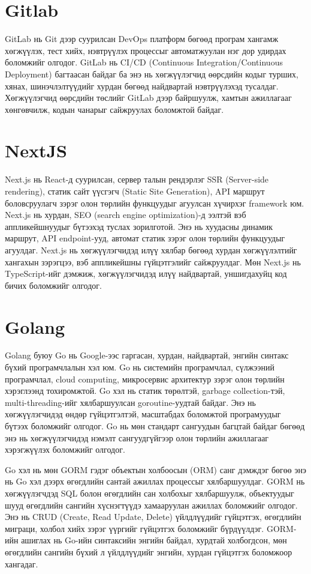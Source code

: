 \section{Gitlab}
GitLab нь Git дээр суурилсан DevOps платформ бөгөөд програм хангамж хөгжүүлэх, тест хийх, нэвтрүүлэх процессыг автоматжуулан нэг дор удирдах боломжийг олгодог. GitLab нь CI/CD (Continuous Integration/Continuous Deployment) багтаасан байдаг ба энэ нь хөгжүүлэгчид өөрсдийн кодыг турших, хянах, шинэчлэлтүүдийг хурдан бөгөөд найдвартай нэвтрүүлэхэд тусалдаг. Хөгжүүлэгчид өөрсдийн төслийг GitLab дээр байршуулж, хамтын ажиллагааг хөнгөвчилж, кодын чанарыг сайжруулах боломжтой байдаг.

\section{NextJS}
Next.js нь React-д суурилсан, сервер талын рендэрлэг SSR (Server-side rendering), статик сайт үүсгэгч (Static Site Generation), API маршрут боловсруулагч зэрэг олон төрлийн функцуудыг агуулсан хүчирхэг framework юм. Next.js нь хурдан, SEO (search engine optimization)-д ээлтэй вэб аппликейшнуудыг бүтээхэд туслах зорилготой. Энэ нь хуудасны динамик маршрут, API endpoint-ууд, автомат статик зэрэг олон төрлийн функцуудыг агуулдаг. Next.js нь хөгжүүлэгчидэд илүү хялбар бөгөөд хурдан хөгжүүлэлтийг хангахын зэрэгцээ, вэб аппликейшны гүйцэтгэлийг сайжруулдаг. Мөн Next.js нь TypeScript-ийг дэмжиж, хөгжүүлэгчидэд илүү найдвартай, уншигдахуйц код бичих боломжийг олгодог.

\section{Golang}
Golang буюу Go нь Google-ээс гаргасан, хурдан, найдвартай, энгийн синтакс бүхий програмчлалын хэл юм. Go нь системийн програмчлал, сүлжээний програмчлал, cloud computing, микросервис архитектур зэрэг олон төрлийн хэрэглээнд тохиромжтой. Go хэл нь статик төрөлтэй, garbage collection-тэй, multi-threading-ийг хялбаршуулсан goroutine-уудтай байдаг. Энэ нь хөгжүүлэгчидэд өндөр гүйцэтгэлтэй, масштабдах боломжтой програмуудыг бүтээх боломжийг олгодог. Go нь мөн стандарт сангуудын багцтай байдаг бөгөөд энэ нь хөгжүүлэгчидэд нэмэлт сангуудгүйгээр олон төрлийн ажиллагааг хэрэгжүүлэх боломжийг олгодог.

Go хэл нь мөн GORM гэдэг объектын холбоосын (ORM) санг дэмждэг бөгөө
энэ нь Go хэл дээрх өгөгдлийн сантай ажиллах процессыг
хялбаршуулдаг. GORM нь хөгжүүлэгчдэд SQL болон өгөгдлийн сан
холбохыг хялбаршуулж, объектуудыг шууд өгөгдлийн сангийн хүснэгтүүдэ
хамааруулан ажиллах боломжийг олгодог. Энэ нь CRUD (Create, Read
Update, Delete) үйлдлүүдийг гүйцэтгэх, өгөгдлийн миграци, холбол
хийх зэрэг үүргийг гүйцэтгэх боломжийг бүрдүүлдэг. GORM-ийн ашиглах
нь Go-ийн синтаксийн энгийн байдал, хурдтай холбогдсон, мөн өгөгдлийн
сангийн бүхий л үйлдлүүдийг энгийн, хурдан гүйцэтгэх боломжоор хангадаг.




